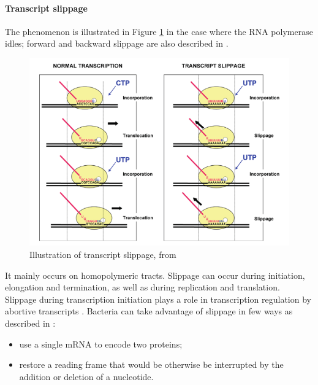 \paragraph{Transcript slippage} The phenomenon is illustrated in Figure \ref{fig:slippage} in the case where the RNA polymerase idles; forward and backward slippage are also described in \cite{ATM:10}.
\begin{figure}[!ht]
	\centering
	\includegraphics[width=0.8\linewidth]{figure/transcriptSlippage}
	\caption{Illustration of transcript slippage, from \cite{ATM:10}}
	\label{fig:slippage}
\end{figure}
It mainly occurs on homopolymeric tracts. Slippage can occur during initiation, elongation and termination, as well as during replication and translation. Slippage during transcription initiation plays a role in transcription regulation by abortive transcripts \cite{Tur:11}. Bacteria can take advantage of slippage in few ways as described in \cite{ATM:10}:
\begin{itemize}
  \item use a single mRNA to encode two proteins;
  \item restore a reading frame that would be otherwise be interrupted by the addition or deletion of a nucleotide.
\end{itemize}
